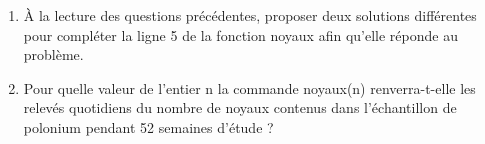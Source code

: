 \begin{enumerate}
	\begin{enumerate}
		\item À la lecture des questions précédentes, proposer deux solutions différentes pour compléter la ligne 5 de la fonction noyaux afin qu'elle réponde au problème.
		\item Pour quelle valeur de l'entier n la commande noyaux(n) renverra-t-elle les relevés quotidiens du nombre de noyaux contenus dans l'échantillon de polonium pendant 52 semaines d'étude ?
	\end{enumerate}
\end{enumerate}

\medskip
